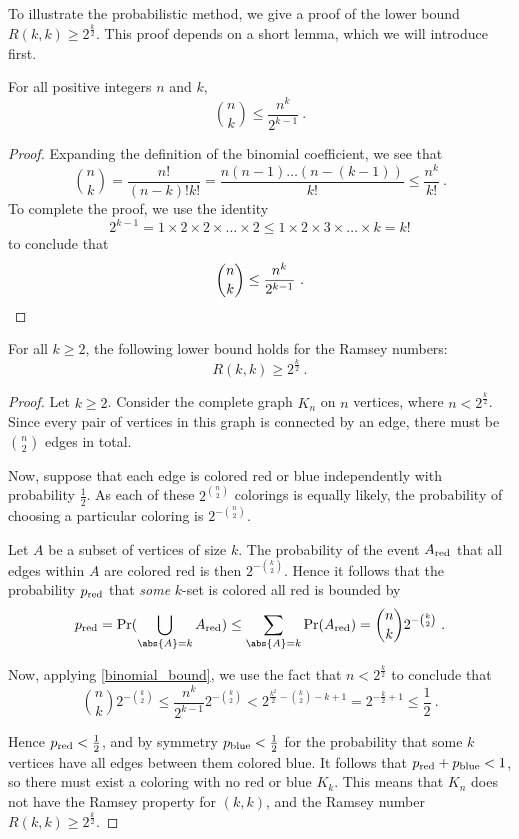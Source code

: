 \documentclass{article}
\begin{document}
To illustrate the probabilistic method, we give a proof of the lower bound $R(k,k) \geq 2^{\frac k 2}$. This proof depends on a short lemma, which we will introduce first.

\begin{Lemma} \label{binomial_bound}
    For all positive integers $n$ and $k$,
    \[ {n \choose k} \leq \frac{n^k}{2^{k-1}} \ . \]
\end{Lemma}

\begin{proof}
    Expanding the definition of the binomial coefficient, we see that
    \[
        {n \choose k}
        = \frac{n!}{(n-k)!k!}
        = \frac{n(n-1)\ldots(n-(k-1))}{k!}
        \leq \frac{n^k}{k!} \ .
    \]
    To complete the proof, we use the identity
    \[
        2^{k-1}
        = 1 \times 2 \times 2 \times \ldots \times 2
        \leq 1 \times 2 \times 3 \times \ldots \times k
        = k!
    \]
    to conclude that
    \[
        {n \choose k} \leq \frac{n^k}{2^{k-1}} \ . \qedhere
    \]
\end{proof}

\begin{Theorem}
    For all $k \geq 2$, the following lower bound holds for the Ramsey numbers:
    \[ R(k,k) \geq 2^{\frac k 2} \ . \]
\end{Theorem}

\begin{proof}
    Let $k \geq 2$. Consider the complete graph $K_n$ on $n$ vertices, where $n < 2^{\frac k 2}$. Since every pair of vertices in this graph is connected by an edge, there must be $n \choose 2$ edges in total.

    Now, suppose that each edge is colored red or blue independently with probability $\frac 1 2$. As each of these $2^{n \choose 2}$ colorings is equally likely, the probability of choosing a particular coloring is $2^{-{n \choose 2}}$.

    Let $A$ be a subset of vertices of size $k$. The probability of the event $A_{\mathrm{red}}$ that all edges within $A$ are colored red is then $2^{-{k \choose 2}}$. Hence it follows that the probability $p_{\mathrm{red}}$ that \emph{some} $k$-set is colored all red is bounded by
    \[
        p_\red = \Pr(\bigcup_{\abs{A} = k} A_\red)
        \leq \sum_{\abs{A} = k} \Pr(A_\red)
        = {n \choose k} 2^{-{k \choose 2}} \ .
    \]

Now, applying \cref{binomial_bound}, we use the fact that $n < 2^{\frac k 2}$ to conclude that
    \[
        {n \choose k} 2^{-{k \choose 2}}
        \leq \frac{n^k}{2^{k-1}} 2^{-{k \choose 2}}
        < 2^{\frac{k^2}{2} - {k \choose 2} - k + 1}
        = 2^{-\frac k 2 + 1}
        \leq \frac 1 2 \ .
    \]

Hence $p_{\mathrm{red}} < \frac 1 2$, and by symmetry $p_{\mathrm{blue}} < \frac 1 2$ for the probability that some $k$ vertices have all edges between them colored blue. It follows that $p_{\mathrm{red}} + p_{\mathrm{blue}} < 1$, so there must exist a coloring with no red or blue $K_k$. This means that $K_n$ does not have the Ramsey property for $(k, k)$, and the Ramsey number $R(k,k) \geq 2^{\frac k 2}$.
\end{proof}



\end{document}
